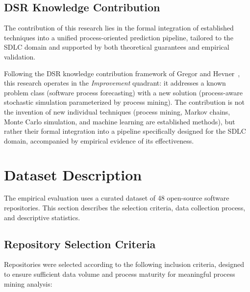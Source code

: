 \subsection{DSR Knowledge Contribution}
\label{sec:dsr-contribution}

The contribution of this research lies in the formal integration of established techniques into a unified process-oriented prediction pipeline, tailored to the SDLC domain and supported by both theoretical guarantees and empirical validation.

Following the DSR knowledge contribution framework of Gregor and 
Hevner~\cite{gregor2013positioning}, this research operates in the 
\emph{Improvement} quadrant: it addresses a known problem class (software 
process forecasting) with a new solution (process-aware stochastic 
simulation parameterized by process mining). The contribution is not the
invention of new individual techniques (process mining, Markov chains, 
Monte Carlo simulation, and machine learning are established methods), 
but rather their formal integration into a pipeline specifically designed 
for the SDLC domain, accompanied by empirical evidence of its 
effectiveness.


\section{Dataset Description}
\label{sec:dataset}

The empirical evaluation uses a curated dataset of 48 open-source software 
repositories. This section describes the selection criteria, data 
collection process, and descriptive statistics.


\subsection{Repository Selection Criteria}
\label{sec:selection-criteria}

Repositories were selected according to the following inclusion criteria, 
designed to ensure sufficient data volume and process maturity for 
meaningful process mining analysis:

